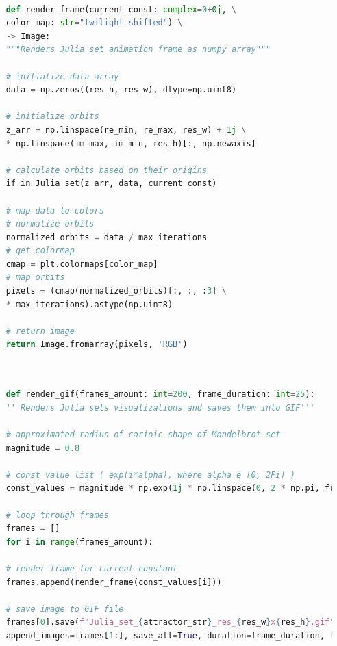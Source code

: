\documentclass{article}
\begin{document}
\pagebreak
{}

\begin{lstlisting}[language=Python, caption=Frame rendering function]
	
	def render_frame(current_const: complex=0+0j, \
	color_map: str="twilight_shifted") \
	-> Image:
	"""Renders Julia set animation frame as numpy array"""	
	
	# initialize data array
	data = np.zeros((res_h, res_w), dtype=np.uint8)
	
	# initialize orbits
	z_arr = np.linspace(re_min, re_max, res_w) + 1j \
	* np.linspace(im_max, im_min, res_h)[:, np.newaxis]
	
	# calculate orbits based on their origins
	if_in_Julia_set(z_arr, data, current_const)
	
	# map data to colors
	# normalize orbits
	normalized_orbits = data / max_iterations
	# get colormap
	cmap = plt.colormaps[color_map]
	# map orbits
	pixels = (cmap(normalized_orbits)[:, :, :3] \
	* max_iterations).astype(np.uint8)
	
	# return image
	return Image.fromarray(pixels, 'RGB')
	
\end{lstlisting}

\pagebreak
{}

\begin{lstlisting}[language=Python, caption=Creation of GIF file]
	
	def render_gif(frames_amount: int=200, frame_duration: int=25):
	'''Renders Julia sets visualizations and saves them into GIF'''
	
	# approximated radius of carioic shape of Mandelbrot set
	magnitude = 0.8
	
	# const value list ( exp(i*alpha), where alpha e [0, 2Pi] )
	const_values = magnitude * np.exp(1j * np.linspace(0, 2 * np.pi, frames_amount))
	
	# loop through frames
	frames = []
	for i in range(frames_amount):
	
	# render frame for current constant
	frames.append(render_frame(const_values[i]))
	
	# save image to GIF file
	frames[0].save(f"Julia_set_{attractor_str}_res_{res_w}x{res_h}.gif", format='GIF', 
	append_images=frames[1:], save_all=True, duration=frame_duration, loop=0)
	
\end{lstlisting}
\end{document}
